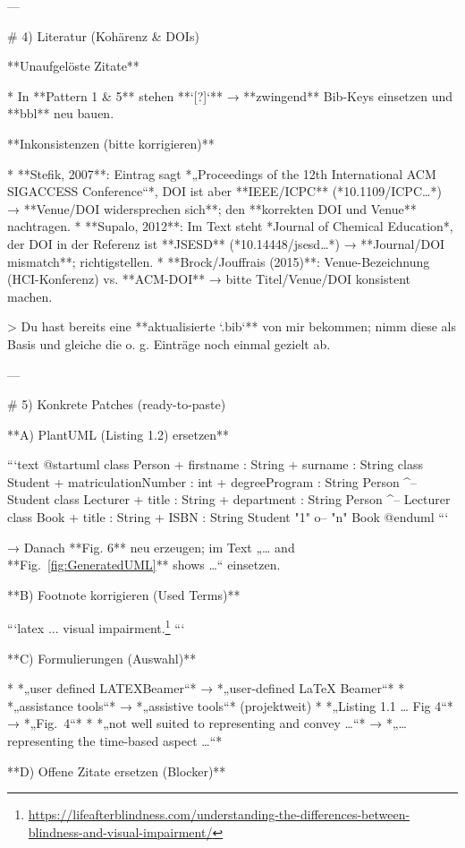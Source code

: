 ---

# 4) Literatur (Kohärenz & DOIs)

**Unaufgelöste Zitate**

* In **Pattern 1 & 5** stehen **`[?]`** → **zwingend** Bib-Keys einsetzen und **bbl** neu bauen. 

**Inkonsistenzen (bitte korrigieren)**

* **Stefik, 2007**: Eintrag sagt *„Proceedings of the 12th International ACM SIGACCESS Conference“*, DOI ist aber **IEEE/ICPC** (*10.1109/ICPC…*) → **Venue/DOI widersprechen sich**; den **korrekten DOI und Venue** nachtragen. 
* **Supalo, 2012**: Im Text steht *Journal of Chemical Education*, der DOI in der Referenz ist **JSESD** (*10.14448/jsesd…*) → **Journal/DOI mismatch**; richtigstellen. 
* **Brock/Jouffrais (2015)**: Venue-Bezeichnung (HCI-Konferenz) vs. **ACM-DOI** → bitte Titel/Venue/DOI konsistent machen. 

> Du hast bereits eine **aktualisierte `.bib`** von mir bekommen; nimm diese als Basis und gleiche die o. g. Einträge noch einmal gezielt ab.

---

# 5) Konkrete Patches (ready-to-paste)

**A) PlantUML (Listing 1.2) ersetzen**

```text
@startuml
class Person {
  + firstname : String
  + surname   : String
}
class Student {
  + matriculationNumber : int
  + degreeProgram       : String
}
Person ^-- Student
class Lecturer {
  + title      : String
  + department : String
}
Person ^-- Lecturer
class Book {
  + title : String
  + ISBN  : String
}
Student "1" o-- "n" Book
@enduml
```

→ Danach **Fig. 6** neu erzeugen; im Text „… and **Fig.~\ref{fig:GeneratedUML}** shows …“ einsetzen. 

**B) Footnote korrigieren (Used Terms)**

```latex
... visual impairment.\footnote{\url{https://lifeafterblindness.com/understanding-the-differences-between-blindness-and-visual-impairment/}}
```



**C) Formulierungen (Auswahl)**

* *„user defined LATEXBeamer“* → *„user-defined \LaTeX{} Beamer“* 
* *„assistance tools“* → *„assistive tools“* (projektweit) 
* *„Listing 1.1 … Fig 4“* → *„Fig.~4“* 
* *„not well suited to representing and convey …“* → *„… representing the time-based aspect …“* 

**D) Offene Zitate ersetzen (Blocker)**

